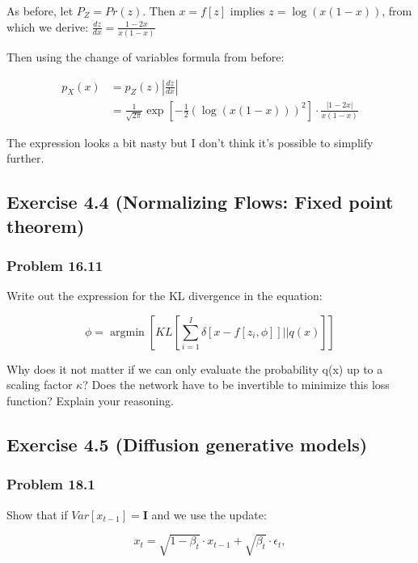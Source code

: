 \documentclass[
10pt, %
a4paper, %
oneside, %
headinclude,footinclude, %
BCOR5mm, %
]{scrartcl}
\DeclareMathOperator*{\argmin}{argmin} %
\begin{document}
As before, let $P_Z = Pr(z)$. Then $x = f[z]$ implies $z = \log(x(1-x))$, from which we derive: $\frac{dz}{dx} = \frac{1-2x}{x(1-x)}$

Then using the change of variables formula from before:

\begin{align*}
  p_X(x) &= p_Z(z) \left|\frac{dz}{dx}\right| \\
  &= \frac{1}{\sqrt{2\pi}} \exp \left[-\frac{1}{2}(\log(x(1-x)))^2 \right] \cdot \frac{|1-2x|}{x(1-x)}
\end{align*}

The expression looks a bit nasty but I don't think it's possible to simplify further.

\newpage

\subsection*{Exercise 4.4 (Normalizing Flows: Fixed point theorem)}

\subsubsection*{Problem 16.11}

Write out the expression for the KL divergence in the equation:

\begin{equation*}
  \phi = \argmin \left[ KL \left[ \sum_{i=1}^I \delta[x-f[z_i,\phi]] || q(x) \right] \right]
\end{equation*}

Why does it not matter if we can only evaluate the probability q(x) up to a scaling factor $\kappa$? Does the network have to be invertible to minimize this loss function? Explain your reasoning.

\subsection*{Exercise 4.5 (Diffusion generative models)}

\subsubsection*{Problem 18.1}

Show that if $Var[x_{t-1}] = \textbf{I}$ and we use the update:

\begin{equation*}
  x_t = \sqrt{1-\beta_t}\cdot x_{t-1} + \sqrt{\beta_t} \cdot \epsilon_t,
\end{equation*}
\end{document}
